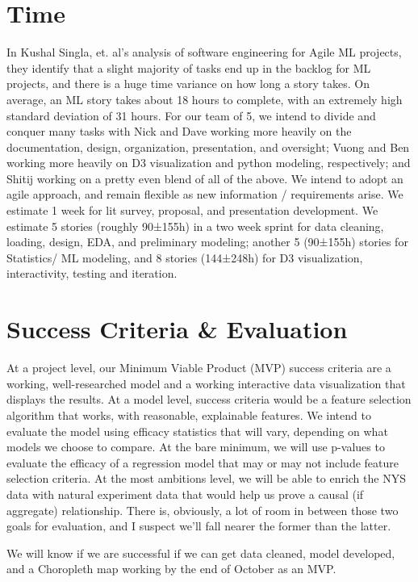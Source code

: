 \documentclass[sigconf,nonacm,11pt]{acmart}
\begin{document}
\section{Time}
In Kushal Singla, et. al's analysis \cite{mltime} of software engineering for Agile ML projects, they identify that a slight majority of tasks end up in the backlog for ML projects, and there is a huge time variance on how long a story takes. On average, an ML story takes about 18 hours to complete, with an extremely high standard deviation of 31 hours.  For our team of 5, we intend to divide and conquer many tasks with Nick and Dave working more heavily on the documentation, design, organization, presentation, and oversight; Vuong and Ben working more heavily on D3 visualization and python modeling, respectively; and Shitij working on a pretty even blend of all of the above.  We intend to adopt an agile approach, and remain flexible as new information / requirements arise.  We estimate 1 week for lit survey, proposal, and presentation development.  We estimate 5 stories (roughly 90±155h) in a two week sprint for data cleaning, loading, design, EDA, and preliminary modeling; another 5 (90±155h) stories for Statistics/ ML modeling, and 8 stories (144±248h) for D3 visualization, interactivity, testing and iteration.

\section{Success Criteria \& Evaluation}
At a project level, our Minimum Viable Product (MVP) success criteria are a working, well-researched model and a working interactive data visualization that displays the results.  At a model level, success criteria would be a feature selection algorithm that works, with reasonable, explainable features.  We intend to evaluate the model using efficacy statistics that will vary, depending on what models we choose to compare.  At the bare minimum, we will use p-values to evaluate the efficacy of a regression model that may or may not include feature selection criteria.  At the most ambitions level, we will be able to enrich the NYS data with natural experiment data that would help us prove a causal (if aggregate) relationship.  There is, obviously, a lot of room in between those two goals for evaluation, and I suspect we'll fall nearer the former than the latter.  

We will know if we are successful if we can get data cleaned, model developed, and a Choropleth map working by the end of October as an MVP.
\end{document}
